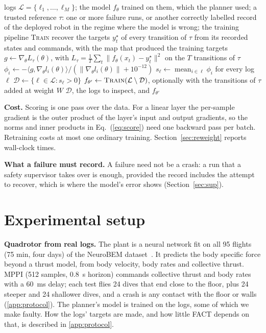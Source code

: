 \documentclass[preprint,12pt]{elsarticle}
\newcommand{\method}{FACT}
\begin{document}
\begin{algorithm}[t]
\caption{\method{}: failure-anchored curation of training logs}\label{alg:fact}
\begin{algorithmic}[1]
\Require logs $\mathcal{L}=\{\ell_1,\dots,\ell_M\}$; the model $f_\theta$ trained on them, which the planner used; a trusted reference $\tau$: one or more failure runs, or another correctly labelled record of the deployed robot in the regime where the model is wrong; the training pipeline \textsc{Train}
\State recover the targets $y^\star_t$ of every transition of $\tau$ from its recorded states and commands, with the map that produced the training targets
\State $g\gets\nabla_\theta L_\tau(\theta)$, with $L_\tau=\frac1T\sum_t\|f_\theta(x_t)-y^\star_t\|^2$ on the $T$ transitions of $\tau$
\State $\phi_i\gets-\langle g,\nabla_\theta l_i(\theta)\rangle/(\|\nabla_\theta l_i(\theta)\|+10^{-12})$ 
\EndFor
\State $s_\ell\gets\operatorname{mean}_{i\in\ell}\phi_i$ for every log $\ell$
\State $\mathcal{D}\gets\{\ell\in\mathcal{L}: s_\ell>0\}$ 
\State $f_{\theta'}\gets\textsc{Train}(\mathcal{L}\setminus\mathcal{D})$, optionally with the transitions of $\tau$ added at weight $W$
\State \Return $\mathcal{D}$, the logs to inspect, and $f_{\theta'}$
\end{algorithmic}
\end{algorithm}

\textbf{Cost.} Scoring is one pass over the data. For a linear layer the per-sample gradient is the outer product of the layer's input and output gradients, so the norms and inner products in Eq.~(\ref{eq:score}) need one backward pass per batch. Retraining costs at most one ordinary training. Section~\ref{sec:reweight} reports wall-clock times.

\textbf{What a failure must record.} A failure need not be a crash: a run that a safety supervisor takes over is enough, provided the record includes the attempt to recover, which is where the model's error shows (Section~\ref{sec:sup}).

\section{Experimental setup}\label{sec:setup}

\textbf{Quadrotor from real logs.} The plant is a neural network fit on all 95 flights (75 min, four days) of the NeuroBEM dataset~\citep{bauersfeld2021neurobem}. It predicts the body specific force beyond a thrust model, from body velocity, body rates and collective thrust. MPPI (512 samples, 0.8~s horizon) commands collective thrust and body rates with a 60~ms delay; each test flies 24 dives that end close to the floor, plus 24 steeper and 24 shallower dives, and a crash is any contact with the floor or walls (\ref{app:protocol}). The planner's model is trained on the logs, some of which we make faulty. How the logs' targets are made, and how little \method{} depends on that, is described in \ref{app:protocol}.
\end{document}
